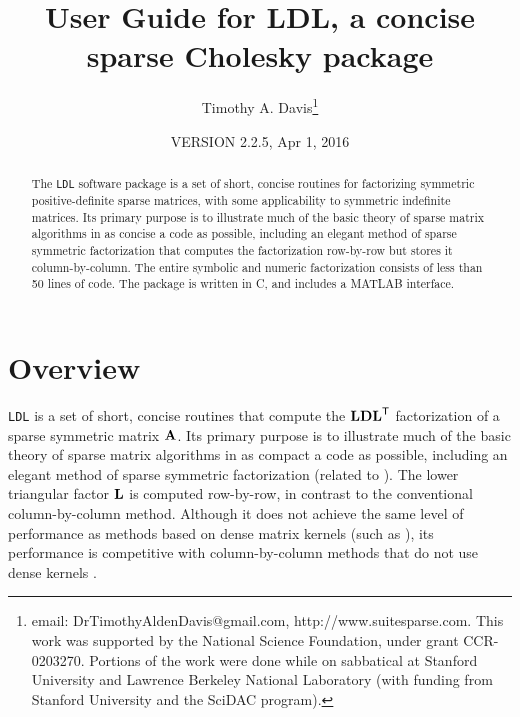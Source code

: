 \documentclass[12pt]{article}
\newcommand{\m}[1]{{\bf{#1}}}       %
\newcommand{\tr}{^{\sf T}}          %
\begin{document}

\title{User Guide for LDL, a concise sparse Cholesky package}
\author{Timothy A. Davis\thanks{
email: DrTimothyAldenDavis@gmail.com,
http://www.suitesparse.com.
This work was supported by the National
Science Foundation, under grant CCR-0203270.
Portions of the work were done while on sabbatical at Stanford University
and Lawrence Berkeley National Laboratory (with funding from Stanford
University and the SciDAC program).
}}

\date{VERSION 2.2.5, Apr 1, 2016}

\maketitle

\begin{abstract}
The {\tt LDL} software package is a set of short, concise routines for
factorizing symmetric positive-definite sparse matrices, with some
applicability to symmetric indefinite matrices.  Its primary purpose is
to illustrate much of the basic theory of sparse matrix algorithms in as
concise a code as possible, including an elegant method
of sparse symmetric factorization that computes the factorization row-by-row
but stores it column-by-column.  The entire symbolic and numeric factorization
consists of less than 50 lines of code.  The package is written in C,
and includes a MATLAB interface.
\end{abstract}

\section{Overview}

{\tt LDL} is a set of short, concise routines that compute the $\m{LDL}\tr$
factorization of a sparse symmetric matrix $\m{A}$.  Its primary purpose is
to illustrate much of the basic theory of sparse matrix algorithms in as
compact a code as possible, including an elegant method of
sparse symmetric factorization (related to \cite{Liu86c,Liu91}).
The lower triangular factor $\m{L}$ is computed row-by-row, in contrast to the
conventional column-by-column method.
Although it does not achieve the same level of performance
as methods based on dense matrix kernels
(such as \cite{NgPeyton93,RothbergGupta91}),
its performance is competitive with column-by-column methods that do not
use dense kernels \cite{GeorgeLiu79, GeorgeLiu, GilbertMolerSchreiber}.
\end{document}
